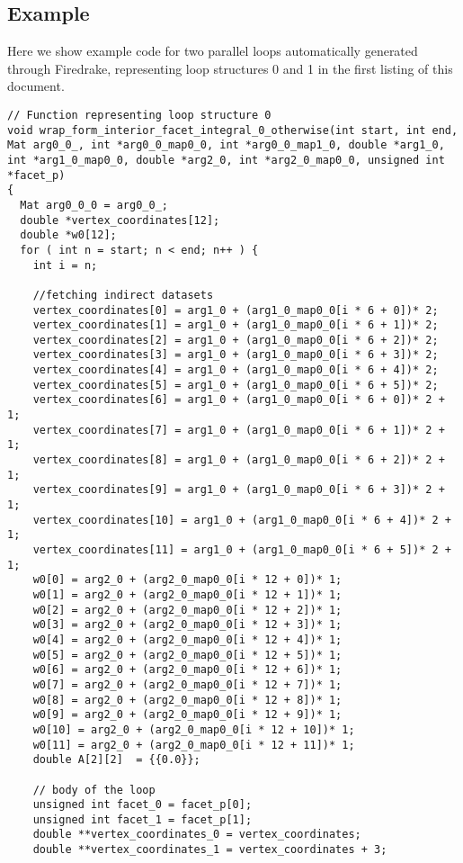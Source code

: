 \documentclass[a4paper]{article}
\begin{document}
\begin{appendices}
\section{Example}
Here we show example code for two parallel loops automatically generated through Firedrake, representing loop structures 0 and 1 in the first listing of this document.

\scriptsize
\begin{lstlisting}
// Function representing loop structure 0
void wrap_form_interior_facet_integral_0_otherwise(int start, int end, Mat arg0_0_, int *arg0_0_map0_0, int *arg0_0_map1_0, double *arg1_0, int *arg1_0_map0_0, double *arg2_0, int *arg2_0_map0_0, unsigned int *facet_p) 
{
  Mat arg0_0_0 = arg0_0_;
  double *vertex_coordinates[12];
  double *w0[12];
  for ( int n = start; n < end; n++ ) {
    int i = n;
    
    //fetching indirect datasets
    vertex_coordinates[0] = arg1_0 + (arg1_0_map0_0[i * 6 + 0])* 2;
    vertex_coordinates[1] = arg1_0 + (arg1_0_map0_0[i * 6 + 1])* 2;
    vertex_coordinates[2] = arg1_0 + (arg1_0_map0_0[i * 6 + 2])* 2;
    vertex_coordinates[3] = arg1_0 + (arg1_0_map0_0[i * 6 + 3])* 2;
    vertex_coordinates[4] = arg1_0 + (arg1_0_map0_0[i * 6 + 4])* 2;
    vertex_coordinates[5] = arg1_0 + (arg1_0_map0_0[i * 6 + 5])* 2;
    vertex_coordinates[6] = arg1_0 + (arg1_0_map0_0[i * 6 + 0])* 2 + 1;
    vertex_coordinates[7] = arg1_0 + (arg1_0_map0_0[i * 6 + 1])* 2 + 1;
    vertex_coordinates[8] = arg1_0 + (arg1_0_map0_0[i * 6 + 2])* 2 + 1;
    vertex_coordinates[9] = arg1_0 + (arg1_0_map0_0[i * 6 + 3])* 2 + 1;
    vertex_coordinates[10] = arg1_0 + (arg1_0_map0_0[i * 6 + 4])* 2 + 1;
    vertex_coordinates[11] = arg1_0 + (arg1_0_map0_0[i * 6 + 5])* 2 + 1;
    w0[0] = arg2_0 + (arg2_0_map0_0[i * 12 + 0])* 1;
    w0[1] = arg2_0 + (arg2_0_map0_0[i * 12 + 1])* 1;
    w0[2] = arg2_0 + (arg2_0_map0_0[i * 12 + 2])* 1;
    w0[3] = arg2_0 + (arg2_0_map0_0[i * 12 + 3])* 1;
    w0[4] = arg2_0 + (arg2_0_map0_0[i * 12 + 4])* 1;
    w0[5] = arg2_0 + (arg2_0_map0_0[i * 12 + 5])* 1;
    w0[6] = arg2_0 + (arg2_0_map0_0[i * 12 + 6])* 1;
    w0[7] = arg2_0 + (arg2_0_map0_0[i * 12 + 7])* 1;
    w0[8] = arg2_0 + (arg2_0_map0_0[i * 12 + 8])* 1;
    w0[9] = arg2_0 + (arg2_0_map0_0[i * 12 + 9])* 1;
    w0[10] = arg2_0 + (arg2_0_map0_0[i * 12 + 10])* 1;
    w0[11] = arg2_0 + (arg2_0_map0_0[i * 12 + 11])* 1;
    double A[2][2]  = {{0.0}};

    // body of the loop
    unsigned int facet_0 = facet_p[0];
    unsigned int facet_1 = facet_p[1];
    double **vertex_coordinates_0 = vertex_coordinates;
    double **vertex_coordinates_1 = vertex_coordinates + 3;


\end{lstlisting}
\end{appendices}
\end{document}
